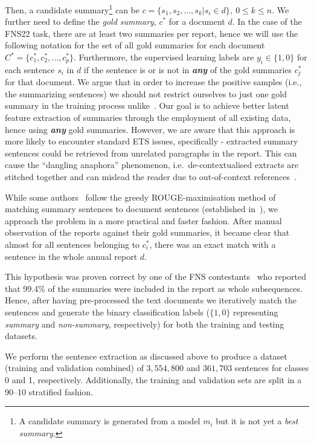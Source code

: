 Then, a candidate summary\footnote{
    A candidate summary is generated from a model $m_{i}$ but it is not yet a \emph{best summary}.
} can be $c=\{s_{1}, s_{2}, \dots, s_{k} | s_{i} \in d \}, \ 0 \leq k \leq n$.
We further need to define the \emph{gold summary}, $c^{*}$ for a document $d$.
In the case of the FNS22 task, there are at least two summaries per report, hence we will use the following notation for the set of all gold summaries for each document $C^{*} = \{c^{*}_{1}, c^{*}_{2}, \dots, c^{*}_{p}\}$.
Furthermore, the supervised learning labels are $y_{i} \in \{1,0\}$ for each sentence $s_{i}$ in $d$ if the sentence is or is not in \textbf{\emph{any}} of the gold summaries $c^{*}_{j}$ for that document.
We argue that in order to increase the positive samples (i.e., the summarizing sentences) we should not restrict
ourselves to just one gold summary in the training process unlike~\cite{orzhenovskii-2021-t5}.
Our goal is to achieve better latent feature extraction of summaries through the employment of all existing data, hence using \textbf{\emph{any}} gold summaries.
However, we are aware that this approach is more likely to encounter standard ETS issues, specifically - extracted summary sentences could be retrieved from unrelated paragraphs in the report.
This can cause the \enquote{dangling anaphora} phenomenon, i.e.\ de-contextualised extracts are stitched together and can mislead the reader due to out-of-context references~\cite{lin2009summarization}.

While some authors~\cite{zmandar-etal-2021-joint} follow the greedy ROUGE-maximisation method of matching summary
sentences to document sentences (established in~\cite{nallapati2017summarunner}), we approach the problem in a
more practical and faster fashion.
After manual observation of the reports against their gold summaries, it became clear that almost for all sentences
belonging to $c^{*}_{i}$, there was an exact match with a sentence in the whole annual report $d$.

This hypothesis was proven correct by one of the FNS contestants~\cite{orzhenovskii-2021-t5} who reported that
99.4\% of the summaries were included in the report as whole subsequences.
Hence, after having pre-processed the text documents we iteratively match the sentences and generate the binary
classification labels ($\{1,0\}$ representing \emph{summary} and \emph{non-summary}, respectively) for both
the training and testing datasets.

We perform the sentence extraction as discussed above to produce a dataset (training and validation combined) of $3,554,800$ and $361,703$ sentences for classes 0 and 1, respectively.
Additionally, the training and validation sets are split in a 90--10 stratified fashion.

